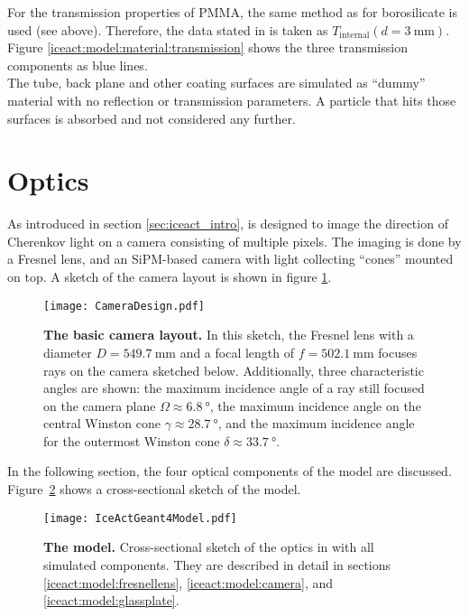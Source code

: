 For the transmission properties of PMMA, the same method as for borosilicate is used (see above). Therefore, the data stated in \cite{famous:niggemann} is taken as $T_\text{internal}(d = \SI{3}{\milli\meter})$. Figure \ref{iceact:model:material:transmission} shows the three transmission components as blue lines.\\

The tube, back plane and other coating surfaces are simulated as \enquote{dummy} material with no reflection or transmission parameters. A particle that hits those surfaces is absorbed and not considered any further.
\newpage

\section{Optics}

As introduced in section \ref{sec:iceact_intro}, \iceact is designed to image the direction of Cherenkov light on a camera consisting of multiple pixels. The imaging is done by a Fresnel lens, and an SiPM-based camera with light collecting \enquote{cones} mounted on top. A sketch of the camera layout is shown in figure \ref{iceact:camera:layout}.\\
\begin{figure}[H]
	\centering
	\texttt{[image: CameraDesign.pdf]}
	\caption[Basic \iceact camera layout]{\textbf{The basic \iceact camera layout.} \cite{iceact:camera} In this sketch, the Fresnel lens with a diameter $D=\SI{549.7}{\milli\meter}$ and a focal length of $f=\SI{502.1}{\milli\meter}$ focuses rays on the camera sketched below. Additionally, three characteristic angles are shown: the maximum incidence angle of a ray still focused on the camera plane $\Omega\approx\SI{6.8}{\degree}$, the maximum incidence angle on the central Winston cone $\gamma\approx\SI{28.7}{\degree}$, and the maximum incidence angle for the outermost Winston cone $\delta\approx\SI{33.7}{\degree}$.}
	\label{iceact:camera:layout}	
\end{figure}

In the following section, the four optical components of the \iceact \geant model are discussed. Figure~\ref{iceact:model:cut} shows a cross-sectional sketch of the model.
\begin{figure}[H]
	\centering
	\texttt{[image: IceActGeant4Model.pdf]}
	\caption[\iceact \geant model]{\textbf{The \iceact \geant model.} Cross-sectional sketch of the \iceact optics in \geant with all simulated components. They are described in detail in sections \ref{iceact:model:fresnellens}, \ref{iceact:model:camera}, and \ref{iceact:model:glassplate}.}
	\label{iceact:model:cut}	
\end{figure}

